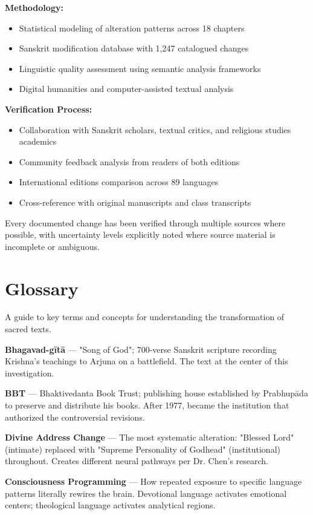 \documentclass[11pt,twoside]{book}
\begin{document}
\textbf{\textbf{Methodology:}}
\begin{itemize}
\item Statistical modeling of alteration patterns across 18 chapters
\item Sanskrit modification database with 1,247 catalogued changes
\item Linguistic quality assessment using semantic analysis frameworks
\item Digital humanities and computer-assisted textual analysis
\end{itemize}

\textbf{\textbf{Verification Process:}}
\begin{itemize}
\item Collaboration with Sanskrit scholars, textual critics, and religious studies academics
\item Community feedback analysis from readers of both editions
\item International editions comparison across 89 languages
\item Cross-reference with original manuscripts and class transcripts
\end{itemize}

Every documented change has been verified through multiple sources where possible, with uncertainty levels explicitly noted where source material is incomplete or ambiguous.
\part*{Glossary}
\label{sec:org8fbe911}
\thispagestyle{plain}

A guide to key terms and concepts for understanding the transformation of sacred texts.

\textbf{\textbf{Bhagavad-gītā}} — "Song of God"; 700-verse Sanskrit scripture recording Krishna's teachings to Arjuna on a battlefield. The text at the center of this investigation.

\textbf{\textbf{BBT}} — Bhaktivedanta Book Trust; publishing house established by Prabhupāda to preserve and distribute his books. After 1977, became the institution that authorized the controversial revisions.

\textbf{\textbf{Divine Address Change}} — The most systematic alteration: "Blessed Lord" (intimate) replaced with "Supreme Personality of Godhead" (institutional) throughout. Creates different neural pathways per Dr. Chen's research.

\textbf{\textbf{Consciousness Programming}} — How repeated exposure to specific language patterns literally rewires the brain. Devotional language activates emotional centers; theological language activates analytical regions.
\end{document}
